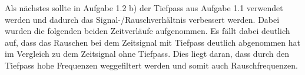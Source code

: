 \documentclass{article}						%
\begin{document}
		Als nächstes sollte in Aufgabe 1.2 b) der Tiefpass aus Aufgabe 1.1 verwendet werden und dadurch das Signal-/Rauschverhältnis verbessert werden. Dabei wurden die folgenden beiden Zeitverläufe aufgenommen. Es fällt dabei deutlich auf, dass das Rauschen bei dem Zeitsignal mit Tiefpass deutlich abgenommen hat im Vergleich zu dem Zeitsignal ohne Tiefpass. Dies liegt daran, dass durch den Tiefpass hohe Frequenzen weggefiltert werden und somit auch Rauschfrequenzen.
		
		\begin{figure}[h!]
		\end{figure}
		
\end{document}
